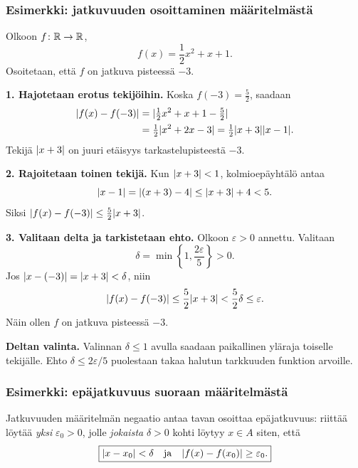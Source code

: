 \documentclass[11pt,a4paper]{amsart}
\begin{document}
\subsubsection*{Esimerkki: jatkuvuuden osoittaminen määritelmästä}

\begin{example}
  Olkoon $f\colon\mathbb{R}\to\mathbb{R}$,
  \[
    f(x)=\frac12x^2+x+1.
  \]
  Osoitetaan, että $f$ on jatkuva pisteessä $-3$.
\end{example}

\begin{solution}
  \textbf{1. Hajotetaan erotus tekijöihin.}
  Koska $f(-3)=\frac52$, saadaan
  \begin{align*}
    \lvert f(x)-f(-3)\rvert
    &=\lvert\tfrac12x^2+x+1-\tfrac52\rvert\\
    &=\tfrac12\lvert x^2+2x-3\rvert
    =\tfrac12\lvert x+3\rvert\lvert x-1\rvert.
  \end{align*}
  Tekijä $\lvert x+3\rvert$ on juuri etäisyys tarkastelupisteestä $-3$.

  \medskip
  \noindent\textbf{2. Rajoitetaan toinen tekijä.}
  Kun $\lvert x+3\rvert<1$, kolmioepäyhtälö antaa
  \[
    \lvert x-1\rvert=\lvert(x+3)-4\rvert
    \le\lvert x+3\rvert+4<5.
  \]
  Siksi $\lvert f(x)-f(-3)\rvert\le\frac52\lvert x+3\rvert$.

  \medskip
  \noindent\textbf{3. Valitaan delta ja tarkistetaan ehto.}
  Olkoon $\varepsilon>0$ annettu. Valitaan
  \[
    \boxed{\delta=\min\left\{1,\frac{2\varepsilon}{5}\right\}>0.}
  \]
  Jos $\lvert x-(-3)\rvert=\lvert x+3\rvert<\delta$, niin
  \[
    \lvert f(x)-f(-3)\rvert
    \le\frac52\lvert x+3\rvert
    <\frac52\delta
    \le\varepsilon.
  \]
  Näin ollen $f$ on jatkuva pisteessä $-3$.
\end{solution}

\medskip
\noindent\textbf{Deltan valinta.}
Valinnan $\delta\le 1$ avulla saadaan paikallinen yläraja toiselle
tekijälle. Ehto $\delta\le 2\varepsilon/5$ puolestaan takaa
halutun tarkkuuden funktion arvoille.

\newpage
\subsubsection*{Esimerkki: epäjatkuvuus suoraan määritelmästä}

Jatkuvuuden määritelmän negaatio antaa tavan osoittaa epäjatkuvuus:
riittää löytää \emph{yksi} $\varepsilon_0>0$, jolle \emph{jokaista}
$\delta>0$ kohti löytyy $x\in A$ siten, että
\[
  \boxed{\lvert x-x_0\rvert<\delta
    \quad\text{ja}\quad
  \lvert f(x)-f(x_0)\rvert\ge\varepsilon_0.}
\]
\end{document}
